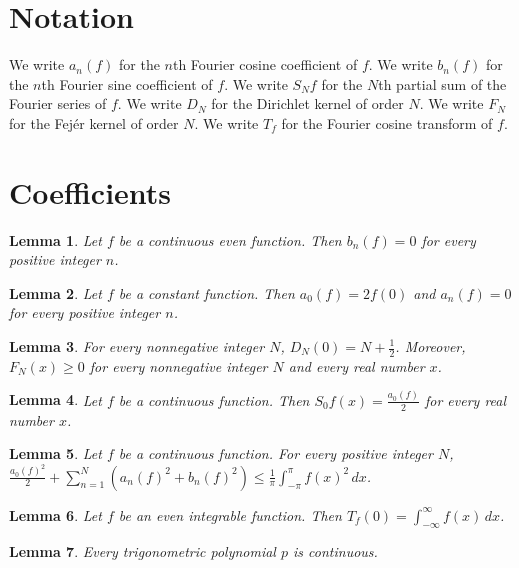 \documentclass{article}
\newtheorem{lemma}{Lemma}
\begin{document}
\section{Notation}

We write $a_n(f)$ for the $n$th Fourier cosine coefficient of $f$.
We write $b_n(f)$ for the $n$th Fourier sine coefficient of $f$.
We write $S_N f$ for the $N$th partial sum of the Fourier series of $f$.
We write $D_N$ for the Dirichlet kernel of order $N$.
We write $F_N$ for the Fejér kernel of order $N$.
We write $T_f$ for the Fourier cosine transform of $f$.

\section{Coefficients}

\begin{lemma}\label{even}
Let $f$ be a continuous even function. Then $b_n(f)=0$ for every positive integer $n$.
\end{lemma}

\begin{lemma}\label{constant}
Let $f$ be a constant function. Then $a_0(f)=2f(0)$ and $a_n(f)=0$ for every positive integer $n$.
\end{lemma}

\begin{lemma}\label{dirichlet}
For every nonnegative integer $N$, $D_N(0)=N+\frac{1}{2}$. Moreover, $F_N(x)\ge0$ for every nonnegative integer $N$ and every real number $x$.
\end{lemma}

\begin{lemma}\label{partial}
Let $f$ be a continuous function. Then $S_0 f(x)=\frac{a_0(f)}{2}$ for every real number $x$.
\end{lemma}

\begin{lemma}\label{bessel}
Let $f$ be a continuous function. For every positive integer $N$, $\frac{a_0(f)^2}{2}+\sum_{n=1}^{N}(a_n(f)^2+b_n(f)^2)\le\frac{1}{\pi}\int_{-\pi}^{\pi}f(x)^2\,dx$.
\end{lemma}

\begin{lemma}\label{transform}
Let $f$ be an even integrable function. Then $T_f(0)=\int_{-\infty}^{\infty}f(x)\,dx$.
\end{lemma}

\begin{lemma}\label{trig}
Every trigonometric polynomial $p$ is continuous.
\end{lemma}
\end{document}
